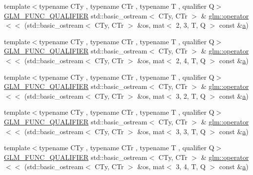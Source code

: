 \begin{DoxyCompactItemize}
\item 
{\footnotesize template$<$typename C\+Ty , typename C\+Tr , typename T , qualifier Q$>$ }\\\hyperlink{setup_8hpp_a33fdea6f91c5f834105f7415e2a64407}{G\+L\+M\+\_\+\+F\+U\+N\+C\+\_\+\+Q\+U\+A\+L\+I\+F\+I\+ER} std\+::basic\+\_\+ostream$<$ C\+Ty, C\+Tr $>$ \& \hyperlink{group__gtx__io_ga2bf4942715dc303be4a8752a44adce55}{glm\+::operator$<$$<$} (std\+::basic\+\_\+ostream$<$ C\+Ty, C\+Tr $>$ \&os, mat$<$ 2, 3, T, Q $>$ const \&\hyperlink{_s_d_l__opengl__glext_8h_a3309789fc188587d666cda5ece79cf82}{a})
\item 
{\footnotesize template$<$typename C\+Ty , typename C\+Tr , typename T , qualifier Q$>$ }\\\hyperlink{setup_8hpp_a33fdea6f91c5f834105f7415e2a64407}{G\+L\+M\+\_\+\+F\+U\+N\+C\+\_\+\+Q\+U\+A\+L\+I\+F\+I\+ER} std\+::basic\+\_\+ostream$<$ C\+Ty, C\+Tr $>$ \& \hyperlink{group__gtx__io_ga79ad9284d3311aad760f84621197c972}{glm\+::operator$<$$<$} (std\+::basic\+\_\+ostream$<$ C\+Ty, C\+Tr $>$ \&os, mat$<$ 2, 4, T, Q $>$ const \&\hyperlink{_s_d_l__opengl__glext_8h_a3309789fc188587d666cda5ece79cf82}{a})
\item 
{\footnotesize template$<$typename C\+Ty , typename C\+Tr , typename T , qualifier Q$>$ }\\\hyperlink{setup_8hpp_a33fdea6f91c5f834105f7415e2a64407}{G\+L\+M\+\_\+\+F\+U\+N\+C\+\_\+\+Q\+U\+A\+L\+I\+F\+I\+ER} std\+::basic\+\_\+ostream$<$ C\+Ty, C\+Tr $>$ \& \hyperlink{group__gtx__io_gacd6666708d198e61ac99b5b144aafdf1}{glm\+::operator$<$$<$} (std\+::basic\+\_\+ostream$<$ C\+Ty, C\+Tr $>$ \&os, mat$<$ 3, 2, T, Q $>$ const \&\hyperlink{_s_d_l__opengl__glext_8h_a3309789fc188587d666cda5ece79cf82}{a})
\item 
{\footnotesize template$<$typename C\+Ty , typename C\+Tr , typename T , qualifier Q$>$ }\\\hyperlink{setup_8hpp_a33fdea6f91c5f834105f7415e2a64407}{G\+L\+M\+\_\+\+F\+U\+N\+C\+\_\+\+Q\+U\+A\+L\+I\+F\+I\+ER} std\+::basic\+\_\+ostream$<$ C\+Ty, C\+Tr $>$ \& \hyperlink{group__gtx__io_ga4de3d5bb444fa0ef69608fc068e27d0e}{glm\+::operator$<$$<$} (std\+::basic\+\_\+ostream$<$ C\+Ty, C\+Tr $>$ \&os, mat$<$ 3, 3, T, Q $>$ const \&\hyperlink{_s_d_l__opengl__glext_8h_a3309789fc188587d666cda5ece79cf82}{a})
\item 
{\footnotesize template$<$typename C\+Ty , typename C\+Tr , typename T , qualifier Q$>$ }\\\hyperlink{setup_8hpp_a33fdea6f91c5f834105f7415e2a64407}{G\+L\+M\+\_\+\+F\+U\+N\+C\+\_\+\+Q\+U\+A\+L\+I\+F\+I\+ER} std\+::basic\+\_\+ostream$<$ C\+Ty, C\+Tr $>$ \& \hyperlink{group__gtx__io_gaa6f5541be2f182df05341e1d254c9a93}{glm\+::operator$<$$<$} (std\+::basic\+\_\+ostream$<$ C\+Ty, C\+Tr $>$ \&os, mat$<$ 3, 4, T, Q $>$ const \&\hyperlink{_s_d_l__opengl__glext_8h_a3309789fc188587d666cda5ece79cf82}{a})

\end{DoxyCompactItemize}
